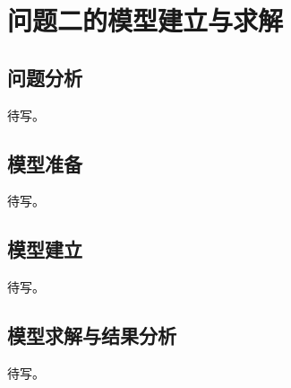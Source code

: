 \section{问题二的模型建立与求解}
\subsection{问题分析}
待写。

\subsection{模型准备}
待写。

\subsection{模型建立}
待写。

\subsection{模型求解与结果分析}
待写。
